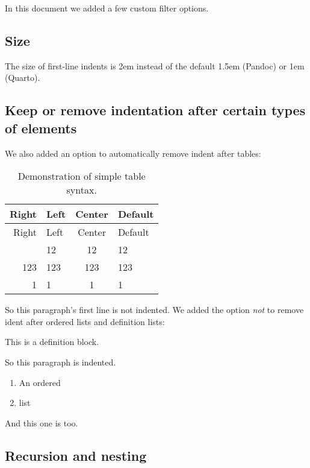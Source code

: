 \documentclass[
]{article}
\providecommand{\tightlist}{%
  \setlength{\itemsep}{0pt}\setlength{\parskip}{0pt}}
\begin{document}
In this document we added a few custom filter options.

\hypertarget{size}{%
\subsection{Size}\label{size}}

The size of first-line indents is 2em instead of the default 1.5em
(Pandoc) or 1em (Quarto).

\hypertarget{keep-or-remove-indentation-after-certain-types-of-elements}{%
\subsection{Keep or remove indentation after certain types of
elements}\label{keep-or-remove-indentation-after-certain-types-of-elements}}

We also added an option to automatically remove indent after tables:

\begin{longtable}[]{@{}rlcl@{}}
\caption{Demonstration of simple table syntax.}\tabularnewline
\toprule\noalign{}
Right & Left & Center & Default \\
\midrule\noalign{}
\endfirsthead
\toprule\noalign{}
Right & Left & Center & Default \\
\midrule\noalign{}
\endhead
\bottomrule\noalign{}
\endlastfoot
12 & 12 & 12 & 12 \\
123 & 123 & 123 & 123 \\
1 & 1 & 1 & 1 \\
\end{longtable}

\noindent So this paragraph's first line is not indented. We added the
option \emph{not} to remove ident after ordered lists and definition
lists:

\begin{description}
\tightlist
\item[Definition]
This is a definition block.
\end{description}

So this paragraph is indented.

\begin{enumerate}
\def\labelenumi{\arabic{enumi}.}
\tightlist
\item
  An ordered
\item
  list
\end{enumerate}

And this one is too.

\hypertarget{recursion-and-nesting}{%
\subsection{Recursion and nesting}\label{recursion-and-nesting}}
\end{document}
